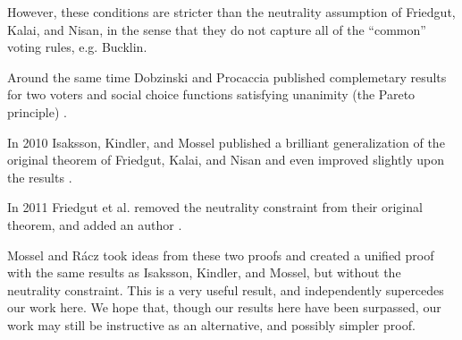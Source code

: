	However, these conditions are stricter than the neutrality assumption of Friedgut, Kalai, and Nisan, in the sense that they do not capture all of the ``common'' voting rules, e.g. Bucklin.

	Around the same time Dobzinski and Procaccia published complemetary results for two voters and social choice functions satisfying unanimity (the Pareto principle) \cite{dobzinski2008frequent}.

	In 2010 Isaksson, Kindler, and Mossel published a brilliant generalization of the original theorem of Friedgut, Kalai, and Nisan and even improved slightly upon the results \cite{isaksson2010geometry}.

	In 2011 Friedgut et al. removed the neutrality constraint from their original theorem, and added an author \cite{friedgut2011quantitative}.

	Mossel and R\'{a}cz \cite{mossel2011quantitative} took ideas from these two proofs and created a unified proof with the same results as Isaksson, Kindler, and Mossel, but without the neutrality constraint. This is a very useful result, and independently supercedes our work here. We hope that, though our results here have been surpassed, our work may still be instructive as an alternative, and possibly simpler proof.
